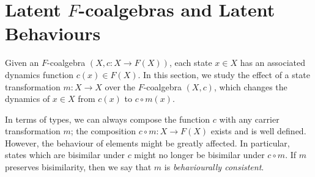 
\section{Latent $F$-coalgebras and Latent Behaviours}
Given an $F$-coalgebra $(X,c\colon X\rightarrow F(X))$, each state $x\in X$ has an associated dynamics function $c(x)\in F(X)$. In this section, we study the effect of a state transformation $m\colon X\rightarrow X$ over the $F$-coalgebra $(X,c)$, which changes the dynamics of $x\in X$ from $c(x)$ to $c\circ m(x)$. 

In terms of types, we can always compose the function $c$ with any carrier transformation $m$; the composition $c \circ m\colon X\rightarrow F(X)$ exists and is well defined. However, the behaviour of elements might be greatly affected. In particular, states which are bisimilar under $c$ might no longer be bisimilar under $c \circ m$. If $m$ preserves bisimilarity, then we say that $m$ is \emph{behaviourally consistent}.

